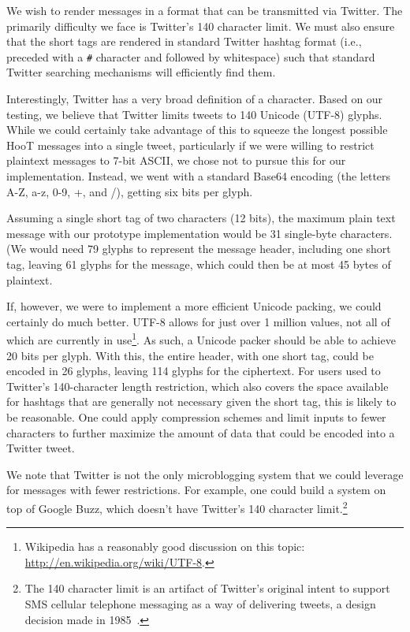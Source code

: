 
We wish to render messages in a format that can be transmitted via
Twitter. The primarily difficulty we face is Twitter's 140 character
limit. We must also ensure that the short tags are rendered in standard
Twitter hashtag format (i.e., preceded with a {\tt \#} character and
followed by whitespace) such that standard Twitter searching mechanisms
will efficiently find them.

Interestingly, Twitter has a very broad definition of a character. Based
on our testing, we believe that Twitter limits tweets to 140 Unicode
(UTF-8) glyphs. While we could certainly take advantage of this to
squeeze the longest possible HooT messages into a single tweet,
particularly if we were willing to restrict \hoot plaintext messages to
7-bit ASCII, we chose not to pursue this for our
implementation. Instead, we went with a standard Base64 encoding (the
letters A-Z, a-z, 0-9, +, and /), getting six bits per glyph.

Assuming a single short tag of two characters (12 bits), the maximum
plain text message with our prototype implementation would be 31
single-byte characters. (We would need 79 glyphs to represent the
message header, including one short tag, leaving 61 glyphs for the
message, which could then be at most 45 bytes of plaintext.

If, however, we were to implement a more efficient Unicode packing, we
could certainly do much better. UTF-8 allows for just over 1 million
values, not all of which are currently in use\footnote{Wikipedia has a
  reasonably good discussion on this topic:
  \url{http://en.wikipedia.org/wiki/UTF-8}.}. As such, a Unicode packer
should be able to achieve 20 bits per glyph. With this, the entire \hoot
header, with one short tag, could be encoded in 26 glyphs, leaving 114
glyphs for the ciphertext. For users used to Twitter's 140-character
length restriction, which also covers the space available for hashtags
that are generally not necessary given the short tag, this is likely to
be reasonable. One could apply compression schemes and limit inputs to
fewer characters to further maximize the amount of data that could be
encoded into a Twitter tweet.

We note that Twitter is not the only microblogging system that we could
leverage for \hoot messages with fewer restrictions. For example, one
could build a \hoot system on top of Google Buzz, which doesn't have
Twitter's 140 character limit.\footnote{The 140 character limit is an
  artifact of Twitter's original intent to support SMS cellular
  telephone messaging as a way of delivering tweets, a design decision
  made in 1985~\cite{latimes-char160}.}
